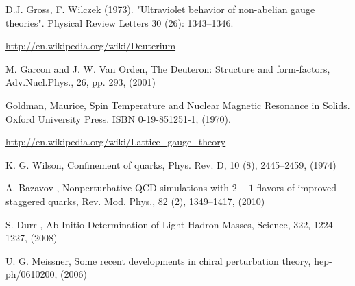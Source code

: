 	
 D.J. Gross, F. Wilczek (1973). "Ultraviolet behavior of non-abelian gauge theories". Physical Review Letters 30 (26): 1343–1346. 


 \href{http://en.wikipedia.org/wiki/Deuterium}{http://en.wikipedia.org/wiki/Deuterium}
	
         M. Garcon and J. W. Van Orden, The Deuteron: Structure and form-factors,
         Adv.Nucl.Phys., 26, pp. 293, (2001)


 Goldman, Maurice, Spin Temperature and Nuclear Magnetic Resonance in Solids. Oxford University Press. ISBN 0-19-851251-1, (1970).

 \href{http://en.wikipedia.org/wiki/Lattice\_gauge\_theory}{http://en.wikipedia.org/wiki/Lattice\_gauge\_theory}	


     K. G. Wilson, Confinement of quarks, 
     Phys. Rev. D, 10 (8), 2445--2459, (1974)


       A. Bazavov \etal, Nonperturbative QCD simulations with $2+1$ flavors of improved staggered quarks,
       Rev. Mod. Phys., 82 (2), 1349--1417, (2010)

        S. Durr \etal, Ab-Initio Determination of Light Hadron Masses, 
        Science, 322,   1224-1227, (2008)    


      U. G. Meissner,       Some recent developments in chiral perturbation theory,
      hep-ph/0610200, (2006)

